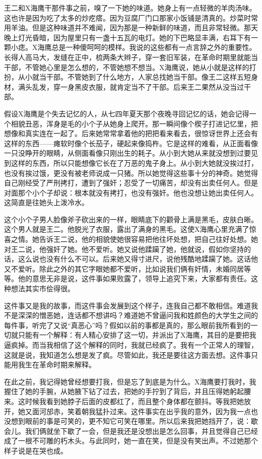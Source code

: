 王二和X海鹰干那件事之前，嗅了一下她的味道。她身上有一点轻微的羊肉汤味。这也许是因为吃了太多的炒疙瘩。因为豆腐厂门口那家小饭铺是清真的。炒菜时常用羊油。但是这种味道并不难闻，因为那是一种新鲜的味道，而且非常轻微。那天晚上灯光昏暗，因为屋里只有一盏十五瓦的电灯。她的下巴略显丰满，右耳下有一颗小痣。X海鹰总是一种傻呵呵的模样。我说的这些都有一点言辞之外的重要性。长得人高马大，发缝在正中，梳两条大辫子，穿一套旧军装，在革命时期里就能当干部，不管她心里是怎么想的，不管她想不想当。X海鹰说，她从小就是这样的打扮，从小就当干部。不管她到了什么地方，人家总找她当干部。像王二这样五短身材，满头乱发，穿一身黑皮衣服，就肯定当不了干部。后来王二果然从没当过干部。 

假设X海鹰是个失去记忆的人，从七四年夏天那个夜晚寻回记忆的话，她会记得一个相貌丑恶，浑身是毛的小个子从她身上爬开。那一瞬间像个楔子打进记忆里，把想像和真实连在一起了。后来她常常拿着他的把把看来看去，很惊讶世界上还会有这样的东西——瘫软时像个长茄子，硬起来像捣杵。它是这样的难看，从正面看像一只没睁开的眼睛，从侧面看像只刚出生的耗子。从小到大她从来就没想到过要见到这样的东西，所以只能想像它长在了万恶的鬼子身上。从小到大她就没挨过打，也没有挨过饿，更没有被老师说成一只猪。所以她觉得这些事十分的神奇。她觉得自己刚经受了严刑拷打，遭到了强奸；忍受了一切痛苦，却没有出卖任何人。但是对面那个小个子却说：根本就没有拷打，也没有强奸。他也没想让她出卖任何人。这简直是往她头上泼冷水。 

这个小个子男人脸像斧子砍出来的一样，眼睛底下的颧骨上满是黑毛，皮肤白晰。这个男人就是王二。他脱光了衣服，露出了满身的黑毛。这使X海鹰心里充满了惊喜之情。她告诉王二说，他的相貌使她很容易把他往坏处想，把自己往好处想。她对王二说，他强奸了她。他不爱听。她又说他蹂躏了她，他就说，假如你坚持的话，这么说也没有什么不可以。后来她又得寸进尺，说他残酷地蹂躏了她。这话他又不爱听。除此之外的其它字眼她都不爱听，比如说我们俩有奸情，未婚同居等等。他的意思无非是说，这件事如果败露了，领导上追究下来，大家都有责任。这种想法其实市侩得很。 

这件事又是我的故事，而这件事会发展到这个样子，连我自己都不敢相信。难道我不是深深的憎恶她，连话都不想讲吗？难道她不曾逼问我和姓颜色的大学生之间的每件事，听完了又说“真恶心”吗？假如以前的事都是真的，那么眼前我所看到的一切就只能有一个解释：有人精心安排了这一切，并派出了X海鹰，其目的是要把我逼疯掉。而当我相信了这个解释的同时，我就已经疯了。我有一个正常人的理智，这就是说，我知道怎么想是发了疯。尽管如此，我还是要往这方面去想。这件事只能用我生在革命时期来解释。 

在此之前，我记得她曾经想要打我，但是忘了到底是为什么。X海鹰要打我时，我握住了她的手腕，从她腋下钻了过去，把她的手拧到了背后，并且压得她躬起腰来。这时候我看到她脖子后面的皮都红了，而且整个身体都在颤抖。等我把她放开，她又面河邡赤，笑着朝我猛扑过来。这件事实在出乎我的意外，因为我一点也没想到眼前的事是可笑的，更不知它可笑在哪里。所以后来我把她挡开了，说：歇会儿。我们俩就坐下歇了一会，但是我还是没想出是怎么回事，并且觉得自己已经成了一根不可雕的朽木头。与此同时，她一直在笑，但是没有笑出声。不过她那个样子说是在哭也成。 

